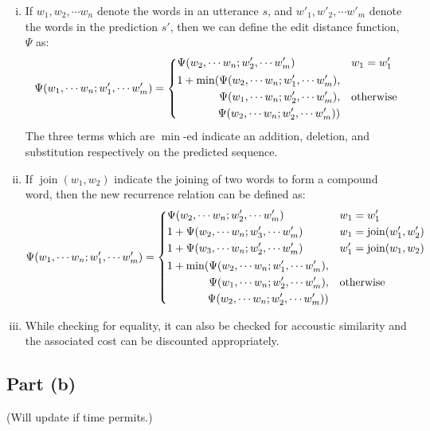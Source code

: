 \documentclass[11pt,a4paper,titlepage]{article}
\begin{document}
\begin{enumerate}[(i)]
    \item If $w_1, w_2, \cdots w_n$ denote the words in an utterance $s$, and $w'_1,
        w'_2, \cdots w'_m$ denote the words in the prediction $s'$, then we can define
        the edit distance function, $\Psi$ as:
        \begin{equation*}
            \Psi(w_1, \cdots w_n; w'_1, \cdots w'_m) =
            \begin{dcases}
                \Psi(w_2, \cdots w_n; w'_2, \cdots w'_m)
                & w_1 = w'_1 \\
                \begin{split}
                    1 + \min(\Psi(w_2, \cdots w_n; w'_1, \cdots w'_m), \\
                         \Psi(w_1, \cdots w_n; w'_2, \cdots w'_m), \\
                         \Psi(w_2, \cdots w_n; w'_2, \cdots w'_m))
                \end{split}
                & \rm otherwise
            \end{dcases}
        \end{equation*}
        The three terms which are $\min$-ed indicate an addition, deletion,
        and substitution respectively on the predicted sequence.
    \item If $\operatorname{join}(w_1, w_2)$ indicate the joining of two words
        to form a compound word, then the new recurrence relation can be
        defined as:
        \begin{equation*}
            \Psi(w_1, \cdots w_n; w'_1, \cdots w'_m) =
            \begin{dcases}
                \Psi(w_2, \cdots w_n; w'_2, \cdots w'_m) & w_1 = w'_1 \\
                1 + \Psi(w_2, \cdots w_n; w'_3, \cdots w'_m)
                & w_1 = \operatorname{join}(w'_1, w'_2) \\
                1 + \Psi(w_3, \cdots w_n; w'_2, \cdots w'_m)
                & w'_1 = \operatorname{join}(w_1, w_2) \\
                \begin{split}
                    1 + \min(\Psi(w_2, \cdots w_n; w'_1, \cdots w'_m), \\
                         \Psi(w_1, \cdots w_n; w'_2, \cdots w'_m), \\
                         \Psi(w_2, \cdots w_n; w'_2, \cdots w'_m))
                \end{split}
                & \rm otherwise
            \end{dcases}
        \end{equation*}
    \item While checking for equality, it can also be checked for accoustic
        similarity and the associated cost can be discounted appropriately.
\end{enumerate}

\subsection*{Part (b)}

(Will update if time permits.)
\end{document}
